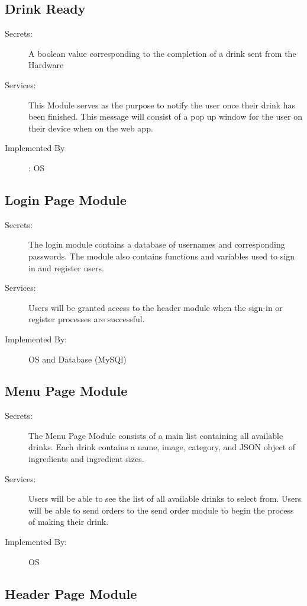 \documentclass[12pt, titlepage]{article}
\begin{document}
 \subsection{Drink Ready}
\begin{description}
\item[Secrets:]A boolean value corresponding to the completion of a drink sent from the Hardware
\item[Services:]This Module serves as the purpose to notify the user once their drink has been finished. This message will consist of a pop up window for the user on their device when on the web app.
\item[Implemented By]: OS
 \end{description}

\subsection{Login Page Module}

\begin{description}
\item[Secrets:] The login module contains a database of usernames and corresponding passwords. The module also contains functions and variables used to sign in and register users.
\item[Services:] Users will be granted access to the header module when the sign-in or register processes are successful.
\item[Implemented By:] OS and Database (MySQl)
\end{description}

\subsection{Menu Page Module}

\begin{description}
\item[Secrets:] The Menu Page Module consists of a main list containing all available drinks. Each drink contains a name, image, category, and JSON object of ingredients and ingredient sizes.
\item[Services:] Users will be able to see the list of all available drinks to select from. Users will be able to send orders to the send order module to begin the process of making their drink.
\item[Implemented By:] OS
\end{description}

\subsection{Header Page Module}
\end{document}
